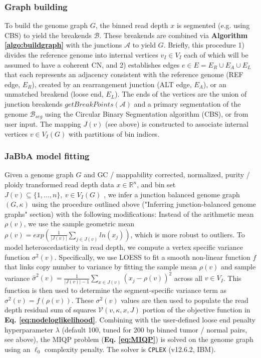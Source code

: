 \documentclass[phd,tocprelim]{cornell}
\begin{document}
\subsubsection*{Graph building}
To build the genome graph $G$, the binned read depth $x$ is segmented (e.g. using CBS) to yield the breakends $\mathcal{B}$.  These breakends are combined via \textbf{Algorithm \ref{algo:buildgraph}} with the junctions $\mathcal{A}$ to yield $G$.  Briefly, this procedure 1) divides the reference genome into internal vertices $v_I \in V_I$ each of which will be assumed to have a coherent CN, and 2) establishes edges $e \in E=E_{R} \cup E_{A} \cup E_{L}$ that each represents an adjacency consistent with the reference genome (REF edge, $E_R$), created by an rearrangement junction (ALT edge, $E_A$), or an unmatched breakend (loose end, $E_L$). The ends of the vertices are the union of junction breakends $getBreakPoints(\mathcal{A})$ and a primary segmentation of the genome $\mathcal{B}_{seg}$ using the Circular Binary Segmentation algorithm \cite{olshen2004} (CBS), or from user input.  The mapping $J(v)$ (see above) is constructed to associate internal vertices $v \in V_I(G)$ with partitions of bin indices.



\subsubsection*{JaBbA model fitting}
Given a genome graph $G$ and GC / mappability corrected, normalized, purity / ploidy transformed read depth data $x \in \mathbb{R}^n$, and bin set $J(v) \subseteq \{1, \ldots, n\},~v \in V_I(G)$ , we infer a junction balanced genome graph $(G, \kappa)$ using the procedure outlined above ("Inferring junction-balanced genome graphs" section) with the following modifications:  Instead of the arithmetic mean $\rho(v)$, we use the sample geometric mean $\rho(v) = exp(\frac{1}{|J(v)|}\sum_{j \in J(v)} ln(x_j))$, which is more robust to outliers.  To model heteroscedasticity in read depth, we compute a vertex specific variance function $\sigma^2(v)$. Specifically, we use LOESS to fit a smooth non-linear function $f$ that links copy number to variance by fitting the sample mean $\rho(v)$ and sample variance  $\hat{\sigma}^2(v) = \frac{1}{|J(v)|-1} \sum_{x \in J(v)} (x_j - \rho(v))^2$ across all $v \in V_I$.  This function is then used to determine the segment-specific variance term as $\sigma^2(v) = f(\rho(v))$.  These $\sigma^2(v)$ values are then used to populate the read depth residual sum of squares $\mathcal{V}(v, \kappa, x, J)$ portion of the objective function in \textbf{Eq. \ref{eq:nodeloglikelihood}}. Combining with the user-defined loose end penalty hyperparameter $\lambda$ (default 100, tuned for 200 bp binned tumor / normal pairs, see above), the MIQP problem (\textbf{Eq. \ref{eq:MIQP}}) is solved on the genome graph using an $\ell_0$ complexity penalty. The solver is \texttt{CPLEX} (v12.6.2, IBM).
\end{document}
